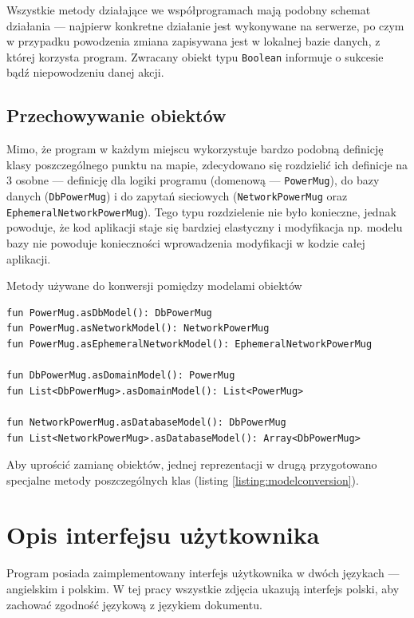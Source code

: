 \documentclass[polish,polish,a4paper,12pt]{article}
\let\sectioncmd\section
\renewcommand{\section}{\clearpage\sectioncmd}
\begin{document}
	Wszystkie metody działające we współprogramach mają podobny schemat działania — najpierw konkretne działanie jest wykonywane na serwerze, po czym w przypadku powodzenia zmiana zapisywana jest w lokalnej bazie danych, z której korzysta program. Zwracany obiekt typu \texttt{Boolean} informuje o sukcesie bądź niepowodzeniu danej akcji.

	\subsection{Przechowywanie obiektów}

	Mimo, że program w każdym miejscu wykorzystuje bardzo podobną definicję klasy poszczególnego punktu na mapie, zdecydowano się rozdzielić ich definicje na 3 osobne — definicję dla logiki programu (domenową — \texttt{PowerMug}), do bazy danych (\texttt{DbPowerMug}) i do zapytań sieciowych (\texttt{NetworkPowerMug} oraz \texttt{EphemeralNetworkPowerMug}). Tego typu rozdzielenie nie było konieczne, jednak powoduje, że kod aplikacji staje się bardziej elastyczny i modyfikacja np. modelu bazy nie powoduje konieczności wprowadzenia modyfikacji w kodzie całej aplikacji.

	\begin{listing}[H]
		\caption{Metody używane do konwersji pomiędzy modelami obiektów}
		\begin{verbatim}
fun PowerMug.asDbModel(): DbPowerMug
fun PowerMug.asNetworkModel(): NetworkPowerMug
fun PowerMug.asEphemeralNetworkModel(): EphemeralNetworkPowerMug

fun DbPowerMug.asDomainModel(): PowerMug
fun List<DbPowerMug>.asDomainModel(): List<PowerMug>

fun NetworkPowerMug.asDatabaseModel(): DbPowerMug
fun List<NetworkPowerMug>.asDatabaseModel(): Array<DbPowerMug>
		\end{verbatim}
		\label{listing:modelconversion}
	\end{listing}

	Aby uprościć zamianę obiektów, jednej reprezentacji w drugą przygotowano specjalne metody poszczególnych klas (listing \ref{listing:modelconversion}).

\section{Opis interfejsu użytkownika}\label{ui}

Program posiada zaimplementowany interfejs użytkownika w dwóch językach — angielskim i polskim. W tej pracy wszystkie zdjęcia ukazują interfejs polski, aby zachować zgodność językową z językiem dokumentu.
\end{document}
